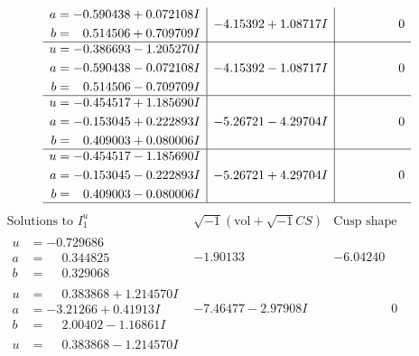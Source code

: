 \documentclass[1p]{elsarticle_modified}
\theoremstyle{definition}
\newcommand{\I}{\sqrt{-1}}
\begin{document}
$$\begin{array}{c|c|c}
\begin{aligned}
a &= -0.590438 + 0.072108 I \\
b &= \phantom{-}0.514506 + 0.709709 I\end{aligned}
 & -4.15392 + 1.08717 I & \phantom{-0.000000 } 0 \\ \hline\begin{aligned}
u &= -0.386693 - 1.205270 I \\
a &= -0.590438 - 0.072108 I \\
b &= \phantom{-}0.514506 - 0.709709 I\end{aligned}
 & -4.15392 - 1.08717 I & \phantom{-0.000000 } 0 \\ \hline\begin{aligned}
u &= -0.454517 + 1.185690 I \\
a &= -0.153045 + 0.222893 I \\
b &= \phantom{-}0.409003 + 0.080006 I\end{aligned}
 & -5.26721 - 4.29704 I & \phantom{-0.000000 } 0 \\ \hline\begin{aligned}
u &= -0.454517 - 1.185690 I \\
a &= -0.153045 - 0.222893 I \\
b &= \phantom{-}0.409003 - 0.080006 I\end{aligned}
 & -5.26721 + 4.29704 I & \phantom{-0.000000 } 0\\
 \hline 
 \end{array}$$\newpage$$\begin{array}{c|c|c}  
\text{Solutions to }I^u_{1}& \I (\text{vol} + \sqrt{-1}CS) & \text{Cusp shape}\\
 \hline 
\begin{aligned}
u &= -0.729686\phantom{ +0.000000I} \\
a &= \phantom{-}0.344825\phantom{ +0.000000I} \\
b &= \phantom{-}0.329068\phantom{ +0.000000I}\end{aligned}
 & -1.90133\phantom{ +0.000000I} & -6.04240\phantom{ +0.000000I} \\ \hline\begin{aligned}
u &= \phantom{-}0.383868 + 1.214570 I \\
a &= -3.21266 + 0.41913 I \\
b &= \phantom{-}2.00402 - 1.16861 I\end{aligned}
 & -7.46477 - 2.97908 I & \phantom{-0.000000 } 0 \\ \hline\begin{aligned}
u &= \phantom{-}0.383868 - 1.214570 I \\

\end{aligned}
\end{array}$$
\end{document}
